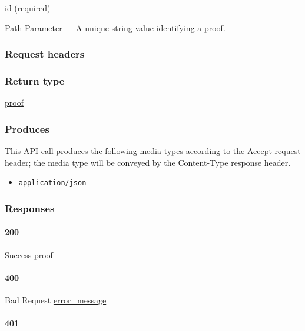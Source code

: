 id (required)

{Path Parameter} --- A unique string value identifying a proof.

\hypertarget{request-headers-90}{%
\subsubsection{Request headers}\label{request-headers-90}}

\hypertarget{return-type-128}{%
\subsubsection{Return type}\label{return-type-128}}

\protect\hyperlink{proof}{proof}

\hypertarget{produces-163}{%
\subsubsection{Produces}\label{produces-163}}

This API call produces the following media types according to the
{Accept} request header; the media type will be conveyed by the
{Content-Type} response header.

\begin{itemize}
\tightlist
\item
  \texttt{application/json}
\end{itemize}

\hypertarget{responses-168}{%
\subsubsection{Responses}\label{responses-168}}

\hypertarget{section-541}{%
\paragraph{200}\label{section-541}}

Success \protect\hyperlink{proof}{proof}

\hypertarget{section-542}{%
\paragraph{400}\label{section-542}}

Bad Request \protect\hyperlink{error_message}{error\_message}

\hypertarget{section-543}{%
\paragraph{401}\label{section-543}}

